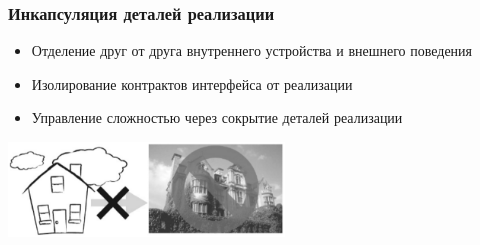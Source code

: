 \documentclass[xetex,mathserif,serif]{beamer}
\begin{document}
	\begin{frame}
		\frametitle{Инкапсуляция деталей реализации}
		\begin{itemize}
			\item Отделение друг от друга внутреннего устройства и внешнего поведения
			\item Изолирование контрактов интерфейса от реализации
			\item Управление сложностью через сокрытие деталей реализации
		\end{itemize}
		\vskip 1.5cm
		\begin{center}
			\includegraphics[width=0.55\textwidth]{incapsulation.png}
		\end{center}
	\end{frame}
\end{document}
